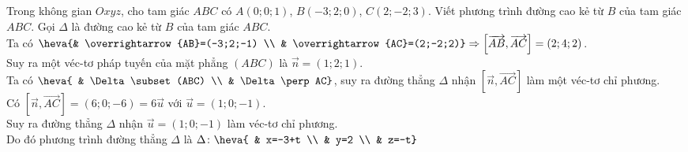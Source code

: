 \TL
\begin{ex}%
Trong không gian $Oxyz$, cho tam giác $ABC$ có $A(0;0;1)$, $B(-3;2;0)$, $C(2;-2;3)$. Viết phương trình đường cao kẻ từ $B$ của tam giác $ABC$.%
\loigiai
{
Gọi $\Delta$ là đường cao kẻ từ $B$ của tam giác $ABC$.\\
Ta có $\heva{& \overrightarrow{AB}=(-3;2;-1) \\ & \overrightarrow{AC}=(2;-2;2)} \Rightarrow \left[\overrightarrow{AB},\overrightarrow{AC}\right]=(2;4;2)$. \\
Suy ra một véc-tơ pháp tuyến của mặt phẳng $(ABC)$ là $\overrightarrow{n}=(1;2;1)$.\\
Ta có $\heva{ & \Delta \subset(ABC) \\ & \Delta \perp AC}$, suy ra đường thẳng $\Delta$ nhận $\left[\overrightarrow{n},\overrightarrow{AC}\right]$ làm một véc-tơ chỉ phương.\\
Có $\left[\overrightarrow{n},\overrightarrow{AC}\right]=(6;0;-6)=6\overrightarrow{u}$ với $\overrightarrow{u}=(1;0;-1)$. \\
Suy ra đường thẳng $\Delta$ nhận $\overrightarrow{u}=(1;0;-1)$ làm véc-tơ chỉ phương.\\
Do đó phương trình đường thẳng $\Delta$ là $\Delta \colon \heva{ & x=-3+t \\ & y=2 \\ & z=-t} $%
}
\end{ex}

